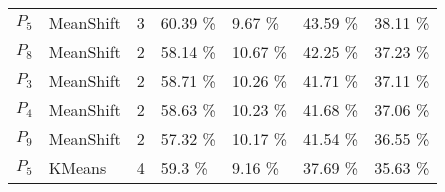\begin{table}[t]
\begin{tabular}{llrllll}
      $P_{5}$ &     MeanShift &         3 &      60.39 \% &        9.67 \% &       43.59 \% &       38.11 \% \\
      $P_{8}$ &     MeanShift &         2 &      58.14 \% &       10.67 \% &       42.25 \% &       37.23 \% \\
      $P_{3}$ &     MeanShift &         2 &      58.71 \% &       10.26 \% &       41.71 \% &       37.11 \% \\
      $P_{4}$ &     MeanShift &         2 &      58.63 \% &       10.23 \% &       41.68 \% &       37.06 \% \\
      $P_{9}$ &     MeanShift &         2 &      57.32 \% &       10.17 \% &       41.54 \% &       36.55 \% \\
      $P_{5}$ &        KMeans &         4 &       59.3 \% &        9.16 \% &       37.69 \% &       35.63 \% \\
\bottomrule
\end{tabular}
\end{table}
